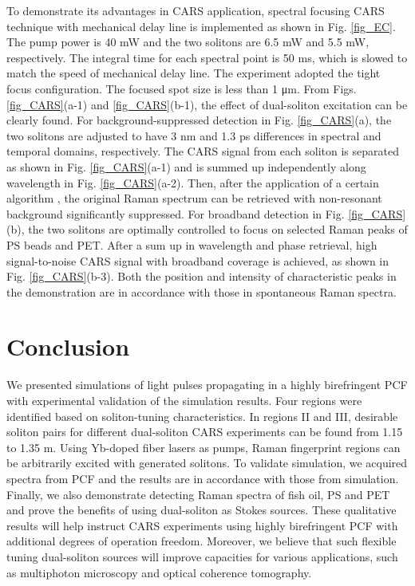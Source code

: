 \documentclass{osa-article}
\begin{document}
To demonstrate its advantages in CARS application, spectral focusing CARS technique with mechanical delay line is implemented as shown in Fig. \ref{fig_EC}. The pump power is 40 mW and the two solitons are 6.5 mW and 5.5 mW, respectively. The integral time for each spectral point is 50 ms, which is slowed to match the speed of mechanical delay line. The experiment adopted the tight focus configuration. The focused spot size is less than 1 μm. From Figs. \ref{fig_CARS}(a-1) and \ref{fig_CARS}(b-1), the effect of dual-soliton excitation can be clearly found. For background-suppressed detection in Fig. \ref{fig_CARS}(a), the two solitons are adjusted to have 3 nm and 1.3 ps differences in spectral and temporal domains, respectively. The CARS signal from each soliton is separated as shown in Fig. \ref{fig_CARS}(a-1) and is summed up independently along wavelength in Fig. \ref{fig_CARS}(a-2). Then, after the application of a certain algorithm \cite{chen_dual-soliton_2016}, the original Raman spectrum can be retrieved with non-resonant background significantly suppressed. For broadband detection in Fig. \ref{fig_CARS}(b), the two solitons are optimally controlled to focus on selected Raman peaks of PS beads and PET. After a sum up in wavelength and phase retrieval, high signal-to-noise CARS signal with broadband coverage is achieved, as shown in Fig. \ref{fig_CARS}(b-3). Both the position and intensity of characteristic peaks in the demonstration are in accordance with those in spontaneous Raman spectra.  


\section{Conclusion}     

We presented simulations of light pulses propagating in a highly birefringent PCF with experimental validation of the simulation results. Four regions were identified based on soliton-tuning characteristics. In regions II and III, desirable soliton pairs for different dual-soliton CARS experiments can be found from 1.15 to 1.35 \textmu m. Using Yb-doped fiber lasers as pumps, Raman fingerprint regions can be arbitrarily excited with generated solitons. To validate simulation, we acquired spectra from PCF and the results are in accordance with those from simulation. Finally, we also demonstrate detecting Raman spectra of fish oil, PS and PET and prove the benefits of using dual-soliton as Stokes sources. These qualitative results will help instruct CARS experiments using highly birefringent PCF with additional degrees of operation freedom. Moreover, we believe that such flexible tuning dual-soliton sources will improve capacities for various applications, such as multiphoton microscopy and optical coherence tomography\cite{ArteagaSierra.2014}.
\end{document}
